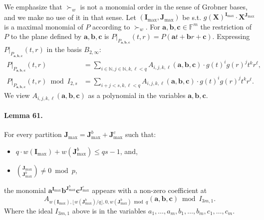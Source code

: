 We emphasize that $\succ_w$ is not a monomial order in the sense of Grobner bases, and we make no use of it in that sense.
Let $(\boldsymbol I_{\max},\boldsymbol J_{\max})$ be s.t. $g(\boldsymbol X)^{\boldsymbol I_{\max}}\cdot\boldsymbol X^{\boldsymbol J_{\max}}$ is a maximal monomial of $P$ according to $\succ_w$.
For $\boldsymbol a,\boldsymbol b,\boldsymbol c\in\mathbb F^m$ the restriction of $P$ to the plane defined by $\boldsymbol a,\boldsymbol b,\boldsymbol c$ is $P|_{P_{\boldsymbol a,\boldsymbol b,\boldsymbol c}}(t,r)=P(\boldsymbol at+\boldsymbol br+\boldsymbol c)$. Expressing $P|_{P_{\boldsymbol a,\boldsymbol b,\boldsymbol c}}(t,r)$ in the basis $B_{2,\infty}$:
\begin{align*}
P|_{P_{\boldsymbol a,\boldsymbol b,\boldsymbol c}}(t,r)&=\sum_{i\in\mathbb N,j\in\mathbb N,k,\ell<q}A_{i,j,k,\ell}(\boldsymbol a,\boldsymbol b,\boldsymbol c)\cdot g(t)^ig(r)^jt^kr^\ell,\\
P|_{P_{\boldsymbol a,\boldsymbol b,\boldsymbol c}}(t,r)\bmod I_{2,s}&=\sum_{i+j<s,k,\ell<q}A_{i,j,k,\ell}(\boldsymbol a,\boldsymbol b,\boldsymbol c)\cdot g(t)^ig(r)^jt^kr^\ell.
\end{align*}
We view $A_{i,j,k,\ell}(\boldsymbol a,\boldsymbol b,\boldsymbol c)$ as a polynomial in the variables $\boldsymbol a,\boldsymbol b,\boldsymbol c$.
\paragraph{Lemma 61.} For every partition $\boldsymbol J_{\max}=\boldsymbol J_{\max}^b+\boldsymbol J_{\max}^c$ such that:
\begin{itemize}
\item $q\cdot w(\boldsymbol I_{\max})+w(\boldsymbol J_{\max}^b)\leq qs-1$, and,
\item $\binom{\boldsymbol J_{\max}}{\boldsymbol J_{\max}^b}\neq0\bmod p$,
\end{itemize}
the monomial $\boldsymbol a^{\boldsymbol I_{\max}}\boldsymbol b^{\boldsymbol J_{\max}^b}\boldsymbol c^{\boldsymbol J_{\max}^c}$ appears with a non-zero coefficient at
\[A_{w(\boldsymbol I_{\max}),\lfloor w(\boldsymbol J_{\max}^b)/q\rfloor,0,w(\boldsymbol J_{\max}^b)\bmod q}(\boldsymbol a,\boldsymbol b,\boldsymbol c)\bmod I_{3m,1}.\]
Where the ideal $I_{3m,1}$ above is in the variables $a_1,\ldots,a_m,b_1,\ldots,b_m,c_1,\ldots,c_m$.
